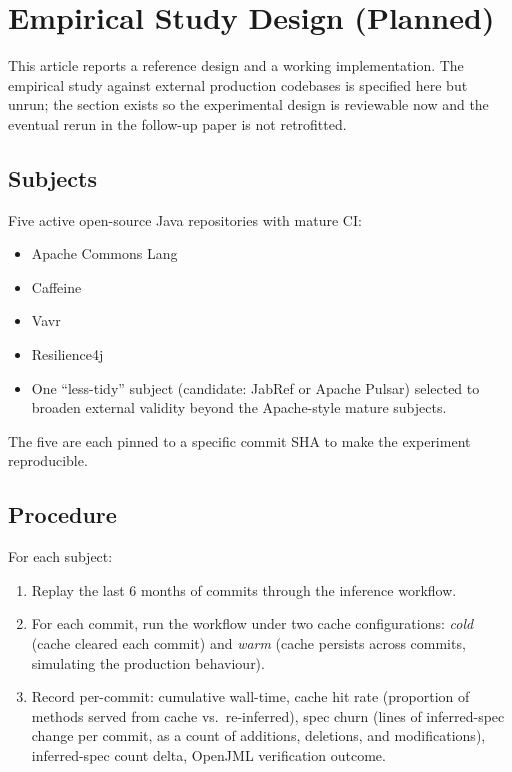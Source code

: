 \section{Empirical Study Design (Planned)}
\label{sec:empirical}

This article reports a reference design and a working implementation. The empirical study against external production codebases is specified here but unrun; the section exists so the experimental design is reviewable now and the eventual rerun in the follow-up paper is not retrofitted.

\subsection{Subjects}

Five active open-source Java repositories with mature CI:

\begin{itemize}
    \item Apache Commons Lang
    \item Caffeine
    \item Vavr
    \item Resilience4j
    \item One ``less-tidy'' subject (candidate: JabRef or Apache Pulsar) selected to broaden external validity beyond the Apache-style mature subjects.
\end{itemize}

The five are each pinned to a specific commit SHA to make the experiment reproducible.

\subsection{Procedure}

For each subject:

\begin{enumerate}
    \item Replay the last 6 months of commits through the inference workflow.
    \item For each commit, run the workflow under two cache configurations: \emph{cold} (cache cleared each commit) and \emph{warm} (cache persists across commits, simulating the production behaviour).
    \item Record per-commit: cumulative wall-time, cache hit rate (proportion of methods served from cache vs.\ re-inferred), spec churn (lines of inferred-spec change per commit, as a count of additions, deletions, and modifications), inferred-spec count delta, OpenJML verification outcome.
\end{enumerate}

